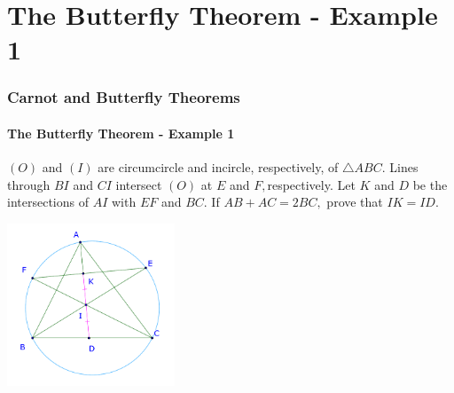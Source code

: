 \documentclass[8pt,xcolor=table,dvipsnames]{beamer}
\begin{document}
\section{The Butterfly Theorem - Example 1}

\begin{frame}[t]
    \frametitle{Carnot and Butterfly Theorems}
    \framesubtitle{The Butterfly Theorem - Example 1}
    \begin{example}
        $(O)$ and $(I)$ are circumcircle and incircle, respectively, of $\triangle ABC.$
        Lines through $BI$ and $CI$ intersect $(O)$ at $E$ and $F,$respectively.
        Let $K$ and $D$ be the intersections of $AI$ with $EF$ and $BC.$
        If $AB + AC = 2BC,$ prove that $IK = ID.$
    \end{example}

    \bigbreak
    \begin{center}
        \includegraphics[width=5cm]{./svg/pdf/24-25-s2-g3-p5.pdf}
    \end{center}
\end{frame}
\end{document}
